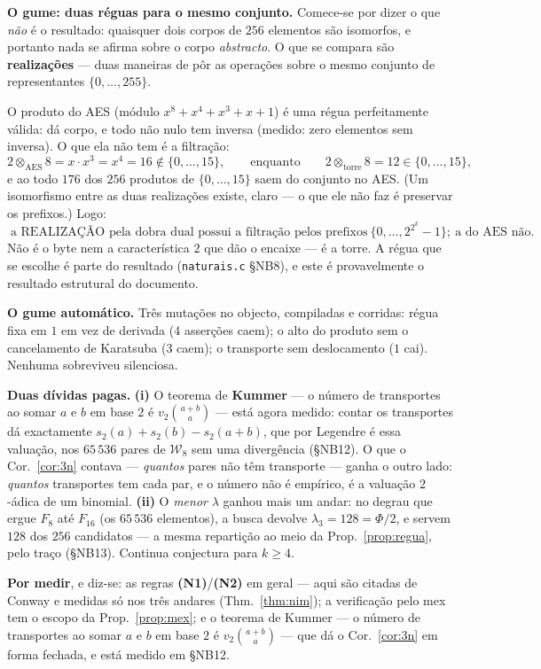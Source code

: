\documentclass[11pt,a4paper]{article}
\newcommand{\code}[1]{\texttt{\small #1}}
\newcommand{\Word}{\mathcal{W}}
\begin{document}
\medskip\noindent\textbf{O gume: duas réguas para o mesmo conjunto.}
Comece-se por dizer o que \emph{não} é o resultado: quaisquer dois corpos de
$256$ elementos são isomorfos, e portanto nada se afirma sobre o corpo
\emph{abstracto}. O que se compara são \textbf{realizações} --- duas maneiras
de pôr as operações sobre o mesmo conjunto de representantes
$\{0,\ldots,255\}$.

O produto do AES (módulo $x^{8}+x^{4}+x^{3}+x+1$) é uma régua perfeitamente
válida: dá corpo, e todo não nulo tem inversa (medido: zero elementos sem
inversa). O que ela não tem é a filtração:
\[
2\otimes_{\mathrm{AES}}8=x\cdot x^{3}=x^{4}=16\notin\{0,\ldots,15\},
\qquad\text{enquanto}\qquad
2\otimes_{\mathrm{torre}}8=12\in\{0,\ldots,15\},
\]
e ao todo $176$ dos $256$ produtos de $\{0,\ldots,15\}$ saem do conjunto no
AES. (Um isomorfismo entre as duas realizações existe, claro --- o que ele não
faz é preservar os prefixos.) Logo:
\[
\boxed{\;\text{a REALIZAÇÃO pela dobra dual possui a filtração pelos prefixos}
\ \{0,\ldots,2^{2^{k}}-1\};\ \text{a do AES não.}\;}
\]
Não é o byte nem a característica $2$ que dão o encaixe --- é a torre. A régua
que se escolhe é parte do resultado (\code{naturais.c} §NB8), e este é
provavelmente o resultado estrutural do documento.

\medskip\noindent\textbf{O gume automático.} Três mutações no objecto,
compiladas e corridas: régua fixa em $1$ em vez de derivada
($4$ asserções caem); o alto do produto sem o cancelamento de Karatsuba
($3$ caem); o transporte sem deslocamento ($1$ cai). Nenhuma sobreviveu
silenciosa.

\medskip\noindent\textbf{Duas dívidas pagas.} \textbf{(i)} O teorema de
\textbf{Kummer} --- o número de transportes ao somar $a$ e $b$ em base $2$ é
$v_2\binom{a+b}{a}$ --- está agora medido: contar os transportes dá exactamente
$s_2(a)+s_2(b)-s_2(a+b)$, que por Legendre é essa valuação, nos $65\,536$ pares
de $\Word_8$ sem uma divergência (§NB12). O que o Cor.~\ref{cor:3n} contava
--- \emph{quantos} pares não têm transporte --- ganha o outro lado: \emph{quantos}
transportes tem cada par, e o número não é empírico, é a valuação $2$-ádica de um
binomial.
\textbf{(ii)} O \emph{menor} $\lambda$ ganhou mais um andar: no degrau que ergue
$F_8$ até $F_{16}$ (os $65\,536$ elementos), a busca devolve
$\lambda_3=128=\Phi/2$, e servem $128$ dos $256$ candidatos --- a mesma
repartição ao meio da Prop.~\ref{prop:regua}, pelo traço (§NB13). Continua
conjectura para $k\ge4$.

\medskip\noindent\textbf{Por medir}, e diz-se: as regras
\textbf{(N1)}/\textbf{(N2)} em geral --- aqui são citadas de Conway e medidas
só nos três andares (Thm.~\ref{thm:nim}); a verificação pelo mex tem o escopo
da Prop.~\ref{prop:mex}; e o teorema de Kummer --- o número de transportes ao somar $a$ e $b$ em base $2$ é
$v_2\binom{a+b}{a}$ --- que dá o Cor.~\ref{cor:3n} em forma fechada, e está medido em §NB12.
\end{document}
